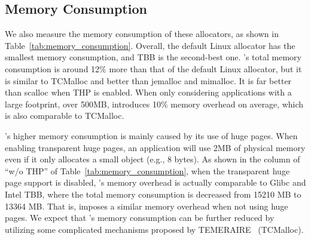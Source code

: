 \subsection{Memory Consumption}
\label{sec:memory}

We also measure the memory consumption of these allocators, as shown in Table~\ref{tab:memory_consumption}.
Overall, the default Linux allocator has the smallest memory consumption, and TBB is the second-best one. \NM{}'s total memory consumption is around 12\% more than that of the default Linux allocator, but it is similar to TCMalloc and better than jemalloc and mimalloc. It is far better than scalloc when THP is enabled. When only considering applications with a large footprint, over 500MB, \NM{} introduces 10\% memory overhead on average, which is also comparable to TCMalloc.  

\NM{}'s higher memory consumption is mainly caused by its use of huge pages. When enabling transparent huge pages, an application will use 2MB of physical memory even if it only allocates a small object (e.g., 8 bytes). As shown in the column of ``w/o THP'' of Table~\ref{tab:memory_consumption}, when the transparent huge page support is disabled, \NM{}'s memory overhead is actually comparable to Glibc and Intel TBB, where the total memory consumption is decreased from 15210 MB to 13364 MB. That is, \NM{} imposes a similar memory overhead when not using huge pages. We expect that \NM{}'s memory consumption can be further reduced by utilizing some complicated mechanisms proposed by TEMERAIRE~\cite{TEMERAIRE} (TCMalloc).   

